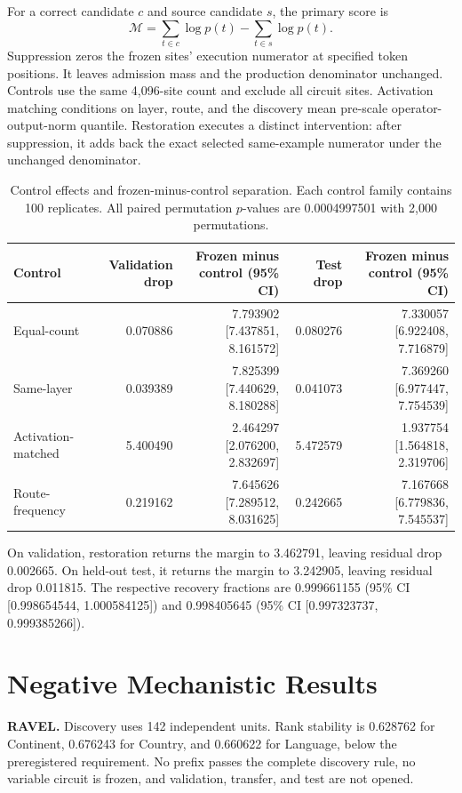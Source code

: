 \documentclass{article}
\newcommand{\smallhead}[1]{\vspace{0.25em}\noindent\textbf{#1}}
\begin{document}
For a correct candidate \(c\) and source candidate \(s\), the primary score is
\[
\mathcal{M}=\sum_{t\in c}\log p(t)-\sum_{t\in s}\log p(t).
\]
Suppression zeros the frozen sites' execution numerator at specified token
positions. It leaves admission mass and the production denominator unchanged.
Controls use the same 4,096-site count and exclude all circuit sites.
Activation matching conditions on layer, route, and the discovery mean
pre-scale operator-output-norm quantile. Restoration executes a distinct
intervention: after suppression, it adds back the exact selected same-example
numerator under the unchanged denominator.

\begin{table}[h]
\centering
\caption{Control effects and frozen-minus-control separation. Each control
family contains 100 replicates. All paired permutation \(p\)-values are
0.0004997501 with 2,000 permutations.}
\label{tab:controls}
\small
\begin{tabular}{lrrrr}
\toprule
Control & Validation drop & Frozen minus control (95\% CI) &
Test drop & Frozen minus control (95\% CI)\\
\midrule
Equal-count & 0.070886 & 7.793902 [7.437851, 8.161572] &
0.080276 & 7.330057 [6.922408, 7.716879]\\
Same-layer & 0.039389 & 7.825399 [7.440629, 8.180288] &
0.041073 & 7.369260 [6.977447, 7.754539]\\
Activation-matched & 5.400490 & 2.464297 [2.076200, 2.832697] &
5.472579 & 1.937754 [1.564818, 2.319706]\\
Route-frequency & 0.219162 & 7.645626 [7.289512, 8.031625] &
0.242665 & 7.167668 [6.779836, 7.545537]\\
\bottomrule
\end{tabular}
\end{table}

On validation, restoration returns the margin to 3.462791, leaving residual
drop 0.002665. On held-out test, it returns the margin to 3.242905, leaving
residual drop 0.011815. The respective recovery fractions are 0.999661155
(95\% CI [0.998654544, 1.000584125]) and 0.998405645
(95\% CI [0.997323737, 0.999385266]).

\section{Negative Mechanistic Results}
\label{app:negative}

\smallhead{RAVEL.}
Discovery uses 142 independent units. Rank stability is 0.628762 for
Continent, 0.676243 for Country, and 0.660622 for Language, below the
preregistered requirement. No prefix passes the complete discovery rule, no
variable circuit is frozen, and validation, transfer, and test are not opened.
\end{document}

